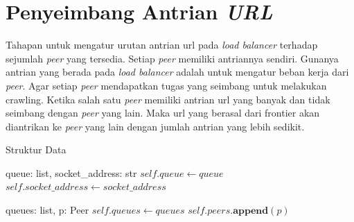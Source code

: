 \section{Penyeimbang Antrian \emph{URL}}

Tahapan untuk mengatur urutan antrian url pada \emph{load balancer} terhadap sejumlah \emph{peer} yang tersedia. Setiap \emph{peer} memiliki antriannya sendiri. Gunanya antrian yang berada pada \emph{load balancer} adalah untuk mengatur beban kerja dari \emph{peer}. Agar setiap \emph{peer} mendapatkan tugas yang seimbang untuk melakukan crawling. Ketika salah satu \emph{peer} memiliki antrian url yang banyak dan tidak seimbang dengan \emph{peer} yang lain. Maka url yang berasal dari frontier akan diantrikan ke \emph{peer} yang lain dengan jumlah antrian yang lebih sedikit.


\begin{algorithm}[H]
  \caption{Struktur Data}\label{alg:peer-to-peer}
  \begin{algorithmic}
     {queue: list, socket\_address: str}
      \State $self.queue \gets queue$
      \State $self.socket\_address \gets socket\_address$
    \EndStruct

    \item[] %

     {queues: list, p: Peer}
      \State $self.queues \gets queues$
      \State $self.peers.\textbf{append}(p)$
    \EndStruct
  \end{algorithmic}
\end{algorithm}



